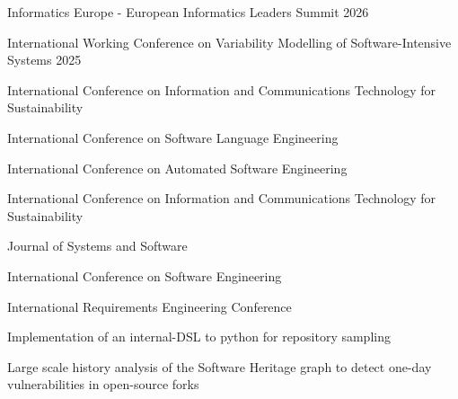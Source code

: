 

{Informatics Europe - European Informatics Leaders Summit 2026}{}
{}

{International Working Conference on Variability Modelling of Software-Intensive Systems 2025}{}
{}

{International Conference on Information and Communications Technology for Sustainability}{}
{}




{International Conference on Software Language Engineering }{}
{}

{International Conference on Automated Software Engineering}{}
{}

{International Conference on Information and Communications Technology for Sustainability}{}
{}


{Journal of Systems and Software}{}{}

{International Conference on Software Engineering}{}{}


{International Requirements Engineering Conference}{}{}




{Implementation of an internal-DSL to python for repository sampling}{}
{}

{Large scale history analysis of the Software Heritage graph to detect one-day vulnerabilities in open-source forks}{}
{}

